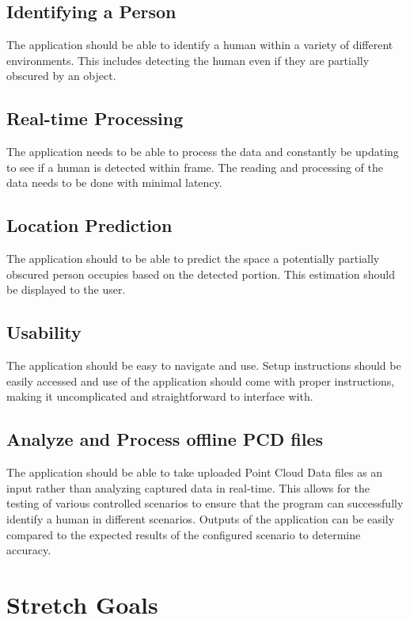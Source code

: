 \documentclass{article}
\begin{document}
\subsection{Identifying a Person}
The application should be able to identify a human within a variety of different environments. This includes detecting the human even if they are partially obscured by an object.

\subsection{Real-time Processing}
The application needs to be able to process the data and constantly be updating to see if a human is detected within frame. The reading and processing of the data needs to be done with minimal latency.

\subsection{Location Prediction}
The application should to be able to predict the space a potentially partially obscured person occupies based on the detected portion. This estimation should be displayed to the user.

\subsection{Usability}
The application should be easy to navigate and use. Setup instructions should be easily accessed and use of the application should come with proper instructions, making it uncomplicated and straightforward to interface with.

\subsection{Analyze and Process offline PCD files}
The application should be able to take uploaded Point Cloud Data files as an input rather than analyzing captured data in real-time. This allows for the testing of various controlled scenarios to ensure that the program can successfully identify a human in different scenarios. Outputs of the application can be easily compared to the expected results of the configured scenario to determine accuracy.
        
\newpage
\section{Stretch Goals}
\end{document}
